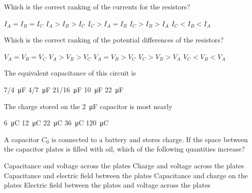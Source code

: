 \documentclass{../../../oss-ap12ibhl}
\begin{document}
\begin{questions}
  \question Which is the correct ranking of the currents for the resistors?
  \label{3resistors1}
  \begin{choices}
    \choice $I_A = I_B = I_C$
    \choice $I_A > I_B > I_C$
    \choice $I_C > I_A = I_B$
    \choice $I_C > I_B > I_A$
    \choice $I_C < I_B < I_A$
  \end{choices}

  \question Which is the correct ranking of the potential differences of the
  resistors?
  \label{3resistors2}
  \begin{choices}
    \choice $V_A = V_B = V_C$
    \choice $V_A > V_B > V_C$
    \choice $V_A = V_B > V_C$
    \choice $V_C > V_B > V_A$
    \choice $V_C < V_B < V_A$
  \end{choices}
  \newpage
  
  
  \question The equivalent capacitance of this circuit is
  \begin{choices}
    \choice\SI{7/4}{\micro\farad}
    \choice\SI{4/7}{\micro\farad}
    \choice\SI{21/16}{\micro\farad}
    \choice\SI{10}{\micro\farad}
    \choice\SI{22}{\micro\farad}
  \end{choices}
  \label{cap1}
    
  \question The charge stored on the \SI{2}{\micro\farad} capacitor is most
  nearly
  \begin{choices}
    \choice \SI{6}{\micro\coulomb}
    \choice \SI{12}{\micro\coulomb}
    \choice \SI{22}{\micro\coulomb}
    \choice \SI{36}{\micro\coulomb}
    \choice \SI{120}{\micro\coulomb}
  \end{choices}
  \label{cap2}
  
  \question A capacitor $C_0$ is connected to a battery and stores charge. If
  the space between the capacitor plates is filled with oil, which of the
  following quantities increase?
  \begin{choices}
    \choice Capacitance and voltage across the plates
    \choice Charge and voltage across the plates
    \choice Capacitance and electric field between the plates
    \choice Capacitance and charge on the plates
    \choice Electric field between the plates and voltage across the plates
  \end{choices}


\end{questions}
\end{document}
